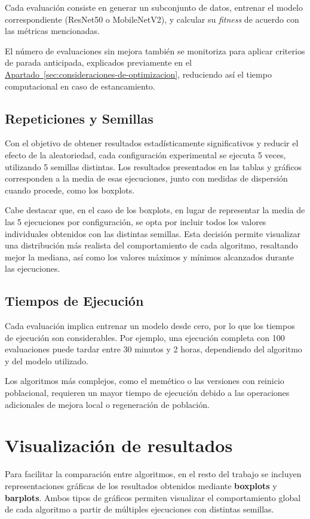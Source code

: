 Cada evaluación consiste en generar un subconjunto de datos, entrenar el modelo correspondiente (ResNet50 o MobileNetV2),
y calcular su \textit{fitness} de acuerdo con las métricas mencionadas.

El número de evaluaciones sin mejora también se monitoriza para aplicar criterios de parada anticipada,
explicados previamente en el \hyperref[sec:consideraciones-de-optimizacion]{Apartado~\ref*{sec:consideraciones-de-optimizacion}},
reduciendo así el tiempo computacional en caso de estancamiento.

\subsection{Repeticiones y Semillas}\label{sec:repeticiones-y-semillas}
Con el objetivo de obtener resultados estadísticamente significativos y reducir el efecto de la aleatoriedad,
cada configuración experimental se ejecuta 5 veces, utilizando 5 semillas distintas.
Los resultados presentados en las tablas y gráficos corresponden a la media de esas ejecuciones,
junto con medidas de dispersión cuando procede, como los boxplots.

Cabe destacar que, en el caso de los boxplots, en lugar de representar la media de las 5 ejecuciones por configuración,
se opta por incluir todos los valores individuales obtenidos con las distintas semillas.
Esta decisión permite visualizar una distribución más realista del comportamiento de cada algoritmo,
resaltando mejor la mediana, así como los valores máximos y mínimos alcanzados durante las ejecuciones.

\subsection{Tiempos de Ejecución}\label{sec:tiempos-de-ejecucion}
Cada evaluación implica entrenar un modelo desde cero, por lo que los tiempos de ejecución son considerables.
Por ejemplo, una ejecución completa con 100 evaluaciones puede tardar entre 30 minutos y 2 horas,
dependiendo del algoritmo y del modelo utilizado.

Los algoritmos más complejos, como el memético o las versiones con reinicio poblacional,
requieren un mayor tiempo de ejecución debido a las operaciones adicionales de mejora local o regeneración de población.


\section{Visualización de resultados}\label{subsec:visualizacion-de-resultados}
Para facilitar la comparación entre algoritmos, en el resto del trabajo se incluyen representaciones gráficas de los
resultados obtenidos mediante \textbf{boxplots} y \textbf{barplots}.
Ambos tipos de gráficos permiten visualizar el comportamiento global de cada algoritmo a partir de múltiples ejecuciones con distintas semillas.

